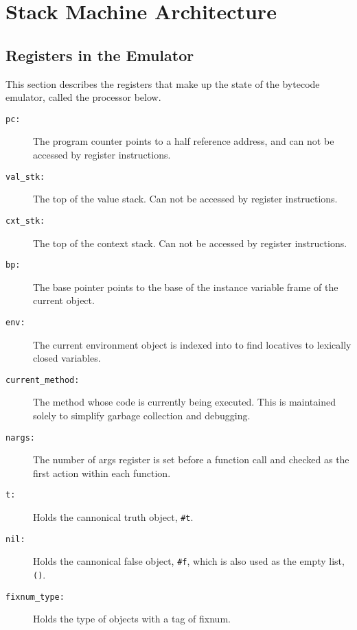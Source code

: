 \chapter{Stack Machine Architecture}


\section{Registers in the Emulator}

This section describes the registers that make up the state of the
bytecode emulator, called the processor below.

\begin{description}

\item[\tt pc:] The program counter points to a half reference
address, and can not be accessed by register instructions.

\item[\tt val\_stk:] The top of the value stack.  Can not be accessed by
register instructions.

\item[\tt cxt\_stk:] The top of the context stack.  Can not be accessed by
register instructions.

\item[\tt bp:] The base pointer points to the base of the instance variable frame
of the current object.

\item[\tt env:] The current environment object is indexed into to find
locatives to lexically closed variables.

\item[\tt current\_method:] The method whose code is currently being
executed.  This is maintained solely to simplify garbage collection
and debugging.

\item[\tt nargs:] The number of args register is set before a function
call and checked as the first action within each function.

\item[\tt t:] Holds the cannonical truth object, \texttt{\#t}.

\item[\tt nil:] Holds the cannonical false object, \texttt{\#f}, which is also
used as the empty list, \texttt{()}.

\item[\tt fixnum\_type:] Holds the type of objects with a tag of fixnum.


\end{description}
